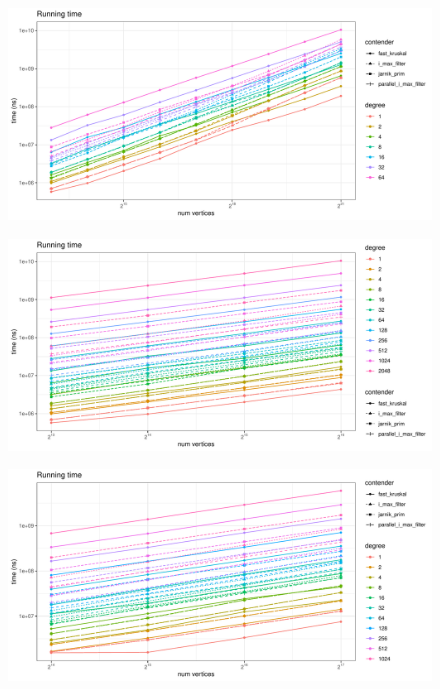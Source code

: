\documentclass{article}
\begin{document}
\begin{figure}[htpb]
  \centering
  \includegraphics[width=\linewidth, page=5]{../plots/13_21_1_64_2147483647_1_2.pdf}
  \caption{}%
  \label{fig:13_21_1_64_2147483647_1_2_p5}
\end{figure}

\begin{figure}[htpb]
  \centering
  \includegraphics[width=\linewidth, page=5]{../plots/13_16_1_2048_2147483647_1_2.pdf}
  \caption{}%
  \label{fig:13_16_1_2048_2147483647_1_2}
\end{figure}

\begin{figure}[htpb]
  \centering
  \includegraphics[width=\linewidth, page=5]{../plots/14_17_1_1024_255_1_2.pdf}
  \caption{}%
  \label{fig:14_17_1_1024_255_1_2}
\end{figure}
\end{document}
